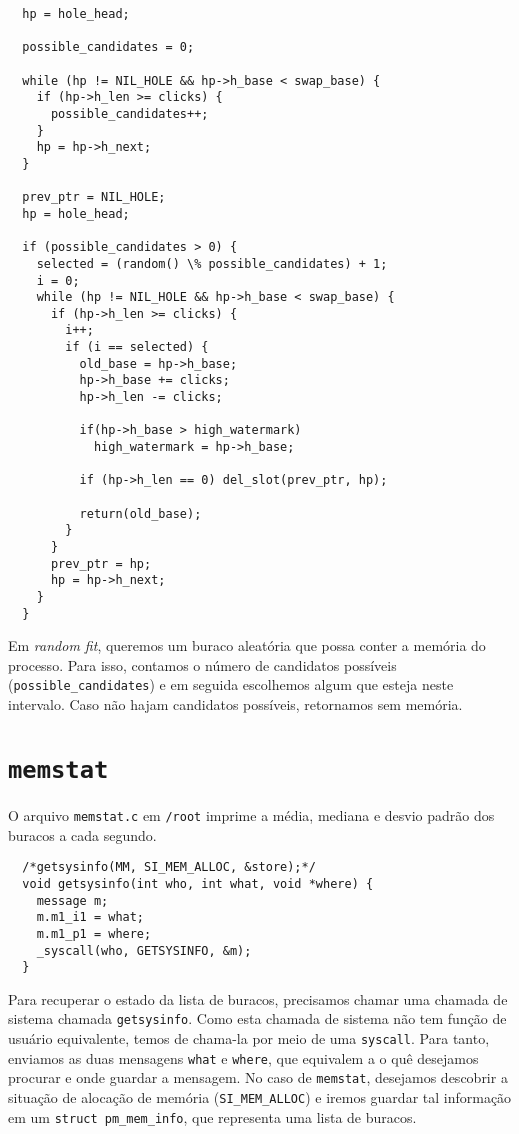 \documentclass{amsart}
\theoremstyle{plain}
\newcommand{\code}[1]{\lstinline[mathescape=true]{#1}}
\begin{document}
\begin{verbatim}
  hp = hole_head;

  possible_candidates = 0;

  while (hp != NIL_HOLE && hp->h_base < swap_base) {
    if (hp->h_len >= clicks) {
      possible_candidates++;
    }
    hp = hp->h_next;
  }

  prev_ptr = NIL_HOLE;
  hp = hole_head;

  if (possible_candidates > 0) {
    selected = (random() \% possible_candidates) + 1;
    i = 0;
    while (hp != NIL_HOLE && hp->h_base < swap_base) {
      if (hp->h_len >= clicks) {
        i++;
        if (i == selected) {
          old_base = hp->h_base;
          hp->h_base += clicks;
          hp->h_len -= clicks;

          if(hp->h_base > high_watermark)
            high_watermark = hp->h_base;

          if (hp->h_len == 0) del_slot(prev_ptr, hp);

          return(old_base);
        }
      }
      prev_ptr = hp;
      hp = hp->h_next;
    }
  }
\end{verbatim}

Em \textit{random fit}, queremos um buraco aleatória que possa conter a memória do processo. Para
isso, contamos o número de candidatos possíveis (\code{possible_candidates}) e em seguida
escolhemos algum que esteja neste intervalo. Caso não hajam candidatos possíveis, retornamos sem
memória.

\section{\code{memstat}}

O arquivo \code{memstat.c} em \code{/root} imprime a média, mediana e desvio padrão dos buracos a
cada segundo.

\begin{verbatim}
  /*getsysinfo(MM, SI_MEM_ALLOC, &store);*/
  void getsysinfo(int who, int what, void *where) {
    message m;
    m.m1_i1 = what;
    m.m1_p1 = where;
    _syscall(who, GETSYSINFO, &m);
  }
\end{verbatim}

Para recuperar o estado da lista de buracos, precisamos chamar uma chamada de sistema chamada
\code{getsysinfo}. Como esta chamada de sistema não tem função de usuário equivalente, temos de
chama-la por meio de uma \code{syscall}. Para tanto, enviamos as duas mensagens \code{what} e
\code{where}, que equivalem a o quê desejamos procurar e onde guardar a mensagem. No caso de
\code{memstat}, desejamos descobrir a situação de alocação de memória (\code{SI_MEM_ALLOC}) e
iremos guardar tal informação em um \code{struct pm_mem_info}, que representa uma lista de buracos.
\end{document}
